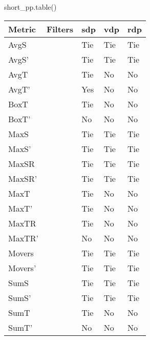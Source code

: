 \documentclass[10pt,letterpaper]{article}
\begin{document}
short\_pp.table()
\begin{tabular}{lllll}
\hline
 Metric   & Filters   & sdp   & vdp   & rdp   \\
\hline
 AvgS     &           & Tie   & Tie   & Tie   \\
 AvgS'    &           & Tie   & Tie   & Tie   \\
 AvgT     &           & Tie   & No    & No    \\
 AvgT'    &           & Yes   & No    & No    \\
 BoxT     &           & Tie   & No    & No    \\
 BoxT'    &           & No    & No    & No    \\
 MaxS     &           & Tie   & Tie   & Tie   \\
 MaxS'    &           & Tie   & Tie   & Tie   \\
 MaxSR    &           & Tie   & Tie   & Tie   \\
 MaxSR'   &           & Tie   & Tie   & Tie   \\
 MaxT     &           & Tie   & No    & No    \\
 MaxT'    &           & Tie   & No    & No    \\
 MaxTR    &           & Tie   & No    & No    \\
 MaxTR'   &           & No    & No    & No    \\
 Movers   &           & Tie   & Tie   & Tie   \\
 Movers'  &           & Tie   & Tie   & Tie   \\
 SumS     &           & Tie   & Tie   & Tie   \\
 SumS'    &           & Tie   & Tie   & Tie   \\
 SumT     &           & Tie   & No    & No    \\
 SumT'    &           & No    & No    & No    \\
\hline
\end{tabular}
\end{document}
